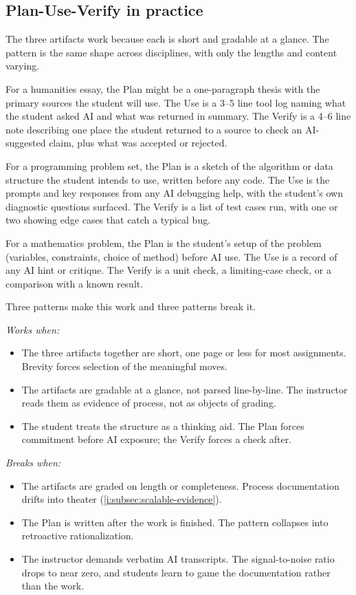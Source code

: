 \documentclass{SIAMbook2023}
\begin{document}
\subsection{Plan-Use-Verify in practice}
\label{i:subsec:plan-use-verify-practice}

The three artifacts work because each is short and gradable at a glance. The pattern is the same shape across disciplines, with only the lengths and content varying.

For a humanities essay, the Plan might be a one-paragraph thesis with the primary sources the student will use. The Use is a 3--5 line tool log naming what the student asked AI and what was returned in summary. The Verify is a 4--6 line note describing one place the student returned to a source to check an AI-suggested claim, plus what was accepted or rejected.

For a programming problem set, the Plan is a sketch of the algorithm or data structure the student intends to use, written before any code. The Use is the prompts and key responses from any AI debugging help, with the student's own diagnostic questions surfaced. The Verify is a list of test cases run, with one or two showing edge cases that catch a typical bug.

For a mathematics problem, the Plan is the student's setup of the problem (variables, constraints, choice of method) before AI use. The Use is a record of any AI hint or critique. The Verify is a unit check, a limiting-case check, or a comparison with a known result.

Three patterns make this work and three patterns break it.

\emph{Works when:}
\begin{itemize}
\item The three artifacts together are short, one page or less for most assignments. Brevity forces selection of the meaningful moves.
\item The artifacts are gradable at a glance, not parsed line-by-line. The instructor reads them as evidence of process, not as objects of grading.
\item The student treats the structure as a thinking aid. The Plan forces commitment before AI exposure; the Verify forces a check after.
\end{itemize}

\emph{Breaks when:}
\begin{itemize}
\item The artifacts are graded on length or completeness. Process documentation drifts into theater (\cref{i:subsec:scalable-evidence}).
\item The Plan is written after the work is finished. The pattern collapses into retroactive rationalization.
\item The instructor demands verbatim AI transcripts. The signal-to-noise ratio drops to near zero, and students learn to game the documentation rather than the work.
\end{itemize}
\end{document}
